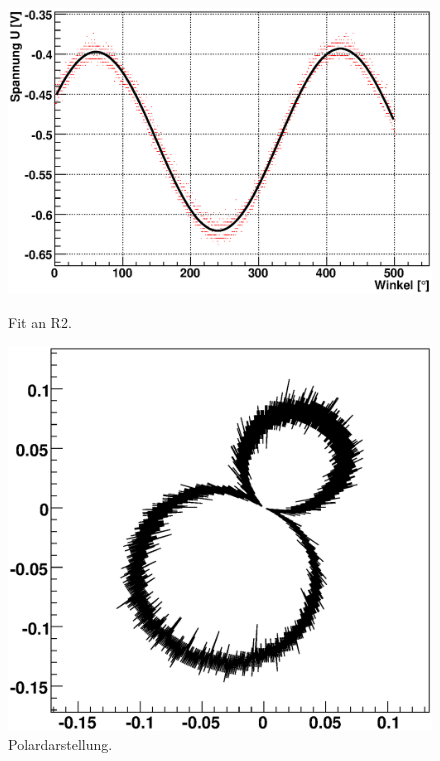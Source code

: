 \documentclass[12pt]{article}
\begin{document}
\begin{figure}[H]  
\begin{minipage}{0.5\linewidth}
\centering
\includegraphics[width=0.9\linewidth]{pictures/R2.eps}
\caption{Fit an R2.}
\end{minipage}
\begin{minipage}{0.5\linewidth}
\centering 
\includegraphics[width=0.9\linewidth]{pictures/R2vd.eps}
\caption{Polardarstellung.}
\end{minipage}
\end{figure}
\end{document}
